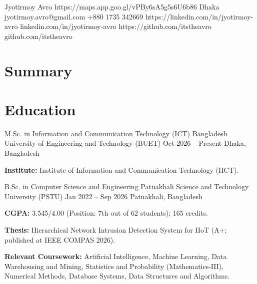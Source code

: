 \documentclass[11pt, a4paper]{article}
\begin{document}


\cvHeader
    {Jyotirmoy Avro}
    {https://maps.app.goo.gl/vPBy6sA5g5s6U6b86}
    {Dhaka}
    {jyotirmoy.avro@gmail.com}
    {+880 1735 342669}
    {https://linkedin.com/in/jyotirmoy-avro}
    {linkedin.com/in/jyotirmoy-avro}
    {https://github.com/itstheavro}
    {github.com/itstheavro}


\section{Summary}


\section{Education}
\cvEducation
    {M.Sc. in Information and Communication Technology (ICT)}
    {Bangladesh University of Engineering and Technology (BUET)}
    {Oct 2026 -- Present}
    {Dhaka, Bangladesh}
    {
        \item \textbf{Institute:} Institute of Information and Communication Technology (IICT).
    }

\cvEducation
    {B.Sc. in Computer Science and Engineering}
    {Patuakhali Science and Technology University (PSTU)}
    {Jan 2022 -- Sep 2026}
    {Patuakhali, Bangladesh}
    {
        \item \textbf{CGPA:} 3.545/4.00 (Position: 7th out of 62 students); 165 credits.
        \item \textbf{Thesis:} Hierarchical Network Intrusion Detection System for IIoT (A+; published at IEEE COMPAS 2026).
        \item \textbf{Relevant Coursework:} Artificial Intelligence, Machine Learning, Data Warehousing and Mining, Statistics and Probability (Mathematics-III), Numerical Methods, Database Systems, Data Structures and Algorithms.
    }
\end{document}
